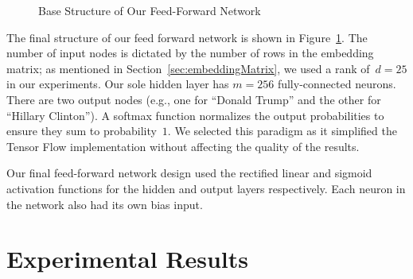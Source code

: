 \documentclass{report}
\begin{document}
\begin{figure}
    \caption{Base Structure of Our Feed-Forward Network}\label{fig:feedForwardNet}
  \end{figure}
  
  The final structure of our feed forward network is shown in Figure~\ref{fig:feedForwardNet}.  The number of input nodes is dictated by the number of rows in the embedding matrix; as mentioned in Section~\ref{sec:embeddingMatrix}, we used a rank of~$d=25$ in our experiments.  Our sole hidden layer has $m=256$ fully-connected neurons. There are two output nodes (e.g., one for ``Donald Trump'' and the other for ``Hillary Clinton'').  A softmax function normalizes the output probabilities to ensure they sum to probability~$1$.  We selected this paradigm as it simplified the Tensor Flow implementation without affecting the quality of the results.
  
  Our final feed-forward network design used the rectified linear and sigmoid activation functions for the hidden and output layers respectively.  Each neuron in the network also had its own bias input.
  
  \section{Experimental Results} \label{sec:experimentalResults}
  
\end{document}
